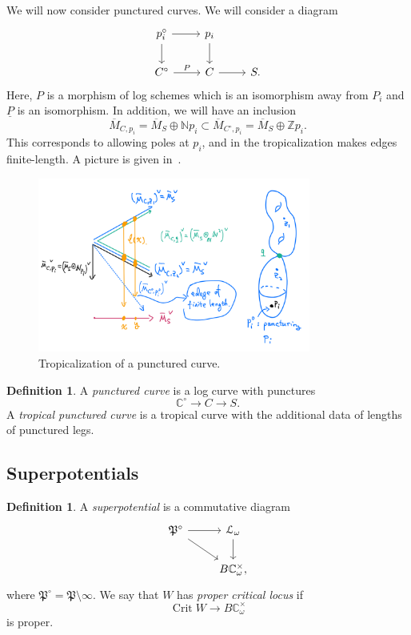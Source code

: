 \documentclass[10pt,oldfontcommands,oneside]{memoir}
\theoremstyle{definition}
\newtheorem{defn}[thm]{Definition}
\theoremstyle{remark}
\theoremstyle{plain}
\theoremstyle{definition}
\theoremstyle{remark}
\newcommand{\N}{\mathbb{N}}
\newcommand{\C}{\mathbb{C}}
\newcommand{\Z}{\mathbb{Z}}
\newcommand{\mc}[1]{\mathcal{#1}}
\newcommand{\mf}[1]{\mathfrak{#1}}
\newcommand{\on}[1]{\operatorname{#1}}
\newcommand{\ol}[1]{\overline{#1}}
\newcommand{\ul}[1]{\underline{#1}}
\newcommand{\1}{\mathbf{1}}
\newcommand{\2}{\mathbf{2}}
\newcommand{\3}{\mathbf{3}}
\begin{document}
We will now consider punctured curves. We will consider a diagram
\begin{equation*}
\begin{tikzcd}
    p_i^{\circ} \ar{r} \ar{d} & p_i \ar{d} \\
    C^{\circ} \ar{r}{P} & C \ar{r} & S.
\end{tikzcd}
\end{equation*}
Here, $P$ is a morphism of log schemes which is an isomorphism away from $P_i$ and $\ul{P}$ is an isomorphism. In addition, we will have an inclusion
\[ \ol{M}_{C,p_i} = \ol{M}_S \oplus \N p_i \subset \ol{M}_{C^{\circ}, p_i} = \ol{M}_S \oplus \Z p_i. \]
This corresponds to allowing poles at $p_i$, and in the tropicalization makes edges finite-length. A picture is given in~.
\begin{figure}[htpb]
    \centering
    \includegraphics[width=0.8\textwidth]{punctured.png}
    \caption{Tropicalization of a punctured curve.}
    \label{fig:punctured-png}
\end{figure}

\begin{defn}
    A \textit{punctured curve} is a log curve with punctures
    \[ \C^{\circ} \to C \to S. \]
    A \textit{tropical punctured curve} is a tropical curve with the additional data of lengths of punctured legs.
\end{defn}

\subsection{Superpotentials}%
\label{sub:Superpotentials}

\begin{defn}
    A \textit{superpotential} is a commutative diagram
    \begin{equation*}
    \begin{tikzcd}
        \mf{P}^{\circ} \ar{r} \ar{dr} & \mc{L}_{\omega} \ar{d} \\
        & B \C^{\times}_{\omega},
    \end{tikzcd}
    \end{equation*}
    where $\mf{P}^{\circ} = \mf{P} \setminus \infty$. We say that $W$ has \textit{proper critical locus} if
    \[ \on{Crit} W \to B \C_{\omega}^{\times} \]
    is proper.
\end{defn}
\end{document}
